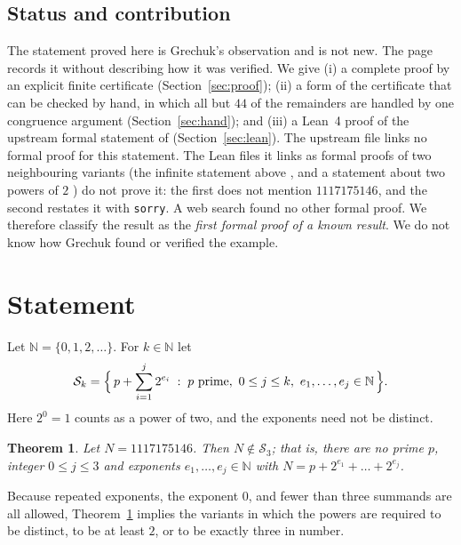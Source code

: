 \documentclass[11pt]{amsart}
\theoremstyle{plain}
\newtheorem{theorem}{Theorem}
\theoremstyle{definition}
\newcommand{\N}{\mathbb{N}}
\newcommand{\cS}{\mathcal{S}}
\begin{document}
\subsection*{Status and contribution}
The statement proved here is Grechuk's observation and is not new.
The page \cite{EP10} records it without describing how it was verified.
We give (i) a complete proof by an explicit finite certificate (Section~\ref{sec:proof}); (ii) a form of the certificate that can be checked by hand, in which all but $44$ of the remainders are handled by one congruence argument (Section~\ref{sec:hand}); and (iii) a Lean~4 proof of the upstream formal statement  of \cite{FC} (Section~\ref{sec:lean}).
The upstream file links no formal proof for this statement. The Lean files it links as formal proofs of two neighbouring variants (the infinite statement above \cite{Da}, and a statement about two powers of $2$ \cite{Oh}) do not prove it: the first does not mention $1117175146$, and the second restates it with \texttt{sorry}. A web search found no other formal proof.
We therefore classify the result as the \emph{first formal proof of a known result}.
We do not know how Grechuk found or verified the example.

\section{Statement}\label{sec:statement}

Let $\N=\{0,1,2,\dots\}$. For $k\in\N$ let
\[
  \cS_k=\Bigl\{\,p+\sum_{i=1}^{j}2^{e_i} \;:\; p \text{ prime},\ 0\le j\le k,\ e_1,\dots,e_j\in\N\,\Bigr\}.
\]
Here $2^0=1$ counts as a power of two, and the exponents need not be distinct.

\begin{theorem}\label{thm:main}
Let $N=1117175146$. Then $N\notin\cS_3$; that is, there are no prime $p$, integer $0\le j\le 3$ and exponents $e_1,\dots,e_j\in\N$ with $N=p+2^{e_1}+\dots+2^{e_j}$.
\end{theorem}

Because repeated exponents, the exponent $0$, and fewer than three summands are all allowed, Theorem~\ref{thm:main} implies the variants in which the powers are required to be distinct, to be at least $2$, or to be exactly three in number.
\end{document}
